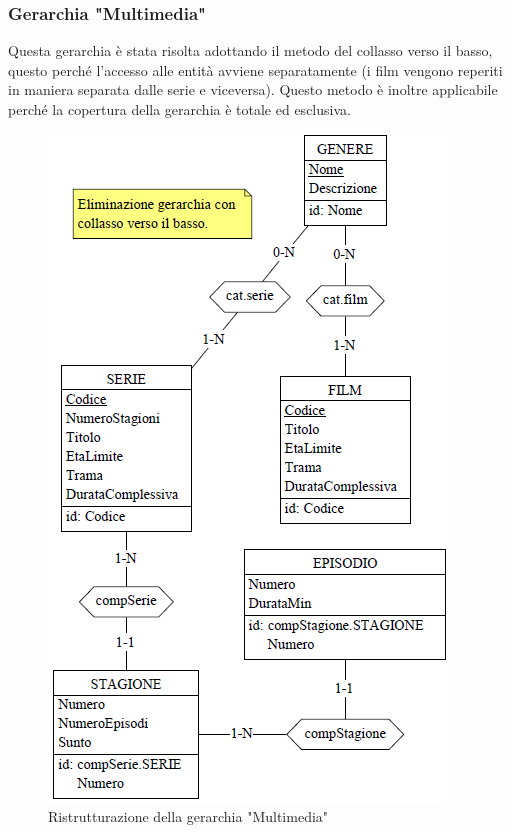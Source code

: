 \documentclass[a4paper,12pt]{report}
\begin{document}
\subsubsection{	Gerarchia "Multimedia"}
Questa gerarchia è stata risolta adottando il metodo del collasso verso il basso, questo perché l'accesso alle entità avviene separatamente (i film vengono reperiti in maniera separata dalle serie e viceversa). Questo metodo è inoltre applicabile perché la copertura della gerarchia è totale ed esclusiva.
\begin{figure}[H]
	\centering
	\includegraphics{ER/ristrutturazione/ristmultimedia.png}
	\caption{Ristrutturazione della gerarchia "Multimedia"}
\end{figure}
\end{document}
